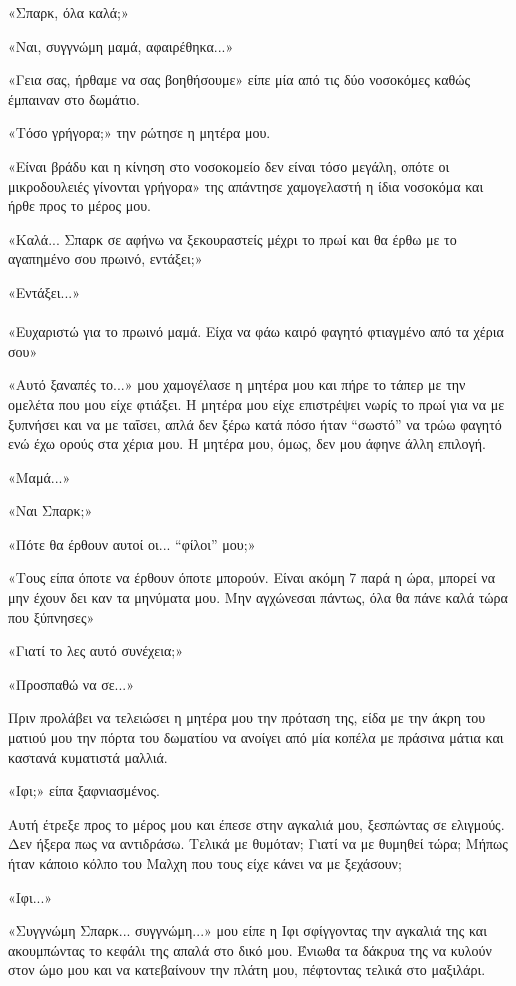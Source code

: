 \documentclass[12pt,twoside, openany]{book}
\begin{document}
«Σπαρκ, όλα καλά;»

«Ναι, συγγνώμη μαμά, αφαιρέθηκα...»

«Γεια σας, ήρθαμε να σας βοηθήσουμε» είπε μία από τις δύο νοσοκόμες καθώς έμπαιναν στο δωμάτιο.

«Τόσο γρήγορα;» την ρώτησε η μητέρα μου.

«Είναι βράδυ και η κίνηση στο νοσοκομείο δεν είναι τόσο μεγάλη, οπότε οι μικροδουλειές γίνονται γρήγορα» της απάντησε χαμογελαστή η ίδια νοσοκόμα και ήρθε προς το μέρος μου.

«Καλά... Σπαρκ σε αφήνω να ξεκουραστείς μέχρι το πρωί και θα έρθω με το αγαπημένο σου πρωινό, εντάξει;»

«Εντάξει...»\\\\

«Ευχαριστώ για το πρωινό μαμά. Είχα να φάω καιρό φαγητό φτιαγμένο από τα χέρια σου»

«Αυτό ξαναπές το...» μου χαμογέλασε η μητέρα μου και πήρε το τάπερ με την ομελέτα που μου είχε φτιάξει. Η μητέρα μου είχε επιστρέψει νωρίς το πρωί για να με ξυπνήσει και να με ταΐσει, απλά δεν ξέρω κατά πόσο ήταν “σωστό” να τρώω φαγητό ενώ έχω ορούς στα χέρια μου. Η μητέρα μου, όμως, δεν μου άφηνε άλλη επιλογή.

«Μαμά...»

«Ναι Σπαρκ;»

«Πότε θα έρθουν αυτοί οι... “φίλοι” μου;»

«Τους είπα όποτε να έρθουν όποτε μπορούν. Είναι ακόμη 7 παρά η ώρα, μπορεί να μην έχουν δει καν τα μηνύματα μου. Μην αγχώνεσαι πάντως, όλα θα πάνε καλά τώρα που ξύπνησες»

«Γιατί το λες αυτό συνέχεια;»

«Προσπαθώ να σε...»

Πριν προλάβει να τελειώσει η μητέρα μου την πρόταση της, είδα με την άκρη του ματιού μου την πόρτα του δωματίου να ανοίγει από μία κοπέλα με πράσινα μάτια και καστανά κυματιστά μαλλιά.

«Ιφι;» είπα ξαφνιασμένος.

Αυτή έτρεξε προς το μέρος μου και έπεσε στην αγκαλιά μου, ξεσπώντας σε ελιγμούς. Δεν ήξερα πως να αντιδράσω. Τελικά με θυμόταν; Γιατί να με θυμηθεί τώρα; Μήπως ήταν κάποιο κόλπο του Μαλχη που τους είχε κάνει να με ξεχάσουν;

«Ιφι...»

«Συγγνώμη Σπαρκ... συγγνώμη...» μου είπε η Ιφι σφίγγοντας την αγκαλιά της και ακουμπώντας το κεφάλι της απαλά στο δικό μου. Ένιωθα τα δάκρυα της να κυλούν στον ώμο μου και να κατεβαίνουν την πλάτη μου, πέφτοντας τελικά στο μαξιλάρι.
\end{document}
